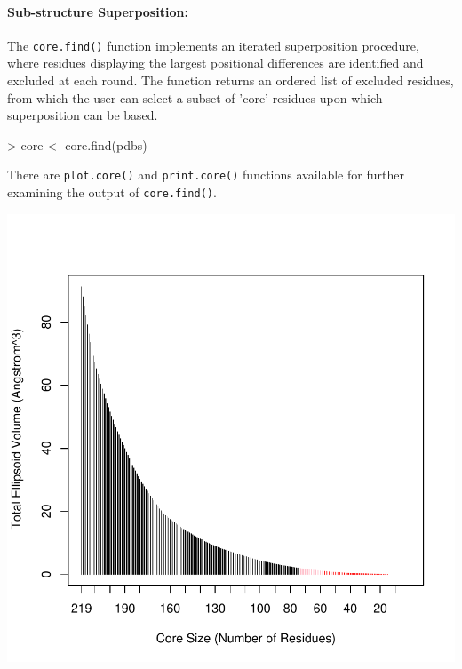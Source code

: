 \documentclass[a4paper]{article}
\begin{document}
\paragraph{Sub-structure Superposition:}
The \texttt{core.find()} function implements an iterated superposition procedure, where residues displaying the largest positional differences are identified and excluded at each round.  The function returns an ordered list of excluded residues, from which the user can select a subset of 'core' residues upon which superposition can be based.

\begin{Schunk}
\begin{Sinput}
> core <- core.find(pdbs)
\end{Sinput}
\end{Schunk}
There are \texttt{plot.core()} and \texttt{print.core()} functions available for further examining the output of \texttt{core.find()}.
\begin{center}
\begin{Schunk}
\end{Schunk}
\includegraphics{figs/fig-010}
\end{center}
\end{document}
